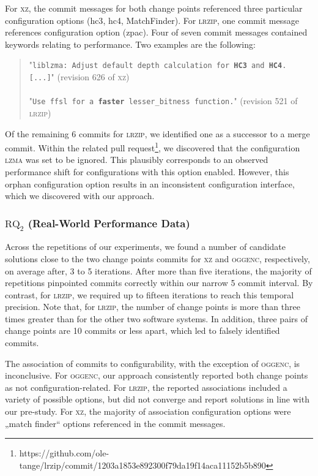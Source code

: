 \documentclass[sigconf]{acmart}
\begin{document}
	For \textsc{xz}, the commit messages for both change points referenced three particular configuration options (\textsf{hc3}, \textsf{hc4}, \textsf{MatchFinder}). For \textsc{lrzip}, one commit message references configuration option (\textsf{zpac}). Four of seven commit messages contained keywords relating to performance. Two examples are the following:
	
	\begin{quotation}
		"\texttt{\footnotesize liblzma: Adjust default depth calculation for \textbf{HC3} and \textbf{HC4}. [...]}" (revision 626 of \textsc{xz})\\\\
		"\texttt{\footnotesize Use ffsl for a \textbf{faster} lesser\_bitness function.}" (revision 521 of \textsc{lrzip})
	\end{quotation}
	
	Of the remaining 6 commits for \textsc{lrzip}, we identified one as a successor to a merge commit. Within the related pull request\footnote{https://github.com/ole-tange/lrzip/commit/1203a1853e892300f79da19f14aca11152b5b890}, we discovered that the configuration \textsc{lzma} was set to be ignored. This plausibly corresponds to an observed performance shift for configurations with this option enabled. However, this orphan configuration option results in an inconsistent configuration interface, which we discovered with our approach. 
	
	\subsubsection{$\text{RQ}_2$ (Real-World Performance Data)}
	Across the repetitions of our experiments, we found a number of candidate solutions close to the two change points commits for \textsc{xz} and \textsc{oggenc}, respectively, on average after, 3 to 5 iterations. After more than five iterations, the majority of repetitions pinpointed commits correctly within our narrow 5 commit interval. By contrast, for \textsc{lrzip}, we required up to fifteen iterations to reach this temporal precision. Note that, for \textsc{lrzip}, the number of change points is more than three times greater than for the other two software systems. In addition, three pairs of change points are 10 commits or less apart, which led to falsely identified commits. 
	
	The association of commits to configurability, with the exception of \textsc{oggenc}, is inconclusive. For \textsc{oggenc}, our approach consistently reported both change points as not configuration-related. For \textsc{lrzip}, the reported associations included a variety of possible options, but did not converge and report solutions in line with our pre-study. For \textsc{xz}, the majority of association configuration options were „match finder“ options referenced in the commit messages.
	
\end{document}
